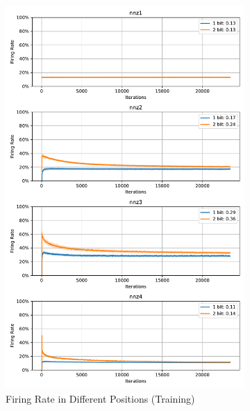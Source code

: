         \begin{figure}[H]
            \centering
            \begin{subfigure}[H]{0.48\textwidth}
                \centering
                \includegraphics[width=\textwidth]{../firerate/MNIST/plots/mnist_train_firerate.pdf}
                \caption{Firing Rate in Different Positions (Training)}
            \end{subfigure}
            \hfill
            \begin{subfigure}[H]{0.48\textwidth}
                \centering

\end{subfigure}
\end{figure}
